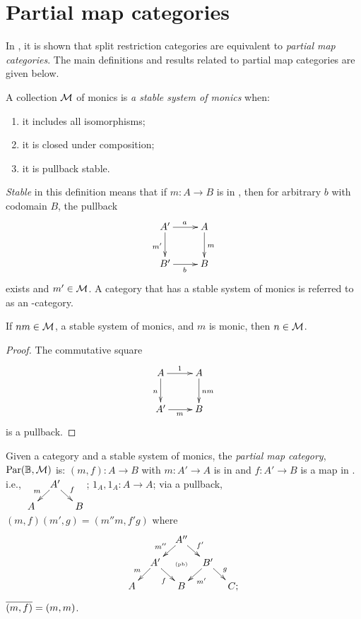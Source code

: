 


\section{Partial map categories} %
\label{sub:partial_map_categories}

In \cite{cockett2002:restcategories1}, it is shown that split restriction categories are
equivalent to \emph{partial map categories}. The main definitions and results related to
partial map categories are given below.

\begin{definition}
  A collection $\mathcal{M}$ of monics is \emph{a stable system of monics}
  when:
  \begin{enumerate}[{(}i{)}]
    \item it includes all isomorphisms;
    \item it is closed under composition;
    \item it is pullback stable.
  \end{enumerate}
\end{definition}

\emph{Stable} in this definition means that if $m:A\to B$ is in \Mstab, then for arbitrary
$b$ with codomain $B$, the pullback
\[
  \xymatrix{
    A'\ar[r]^a \ar[d]_{m'} &A\ar[d]^{m}\\
    B' \ar[r]_{b} & B
  }
\]
exists and $m' \in \mathcal{M}$. A category that has a stable system of monics
is referred to as an \Mstab-category.

\begin{lemma}
  If $n m \in \mathcal{M}$, a stable system of monics, and $m$ is monic, then $n \in \mathcal{M}$.
\end{lemma}
\begin{proof}
  The commutative square
  \[
    \xymatrix{
      A\ar[d]_n \ar[r]^{1} &A\ar[d]^{n m}\\
      A' \ar[r]_{m} & B
    }
  \]
  is a pullback.
\end{proof}

Given a category \B and a stable system of monics, the \emph{partial map category},
$\text{Par}(\mathbb{B},\mathcal{M})$ is:
    {$(m,f):A\to B$  with $m:A' \to A$ is in \Mstab and $f:A' \to B$ is a map in \B. i.e.,
      $\xymatrix @R-15pt @C-15pt{&A'\ar[dl]_{m} \ar[dr]^{f}\\A&&B}$;}
    {$1_A,1_A:A \to A$;}
    {via a pullback, $(m,f)(m',g) = (m'' m, f' g)$ where
      \[
        \xymatrix @C-15pt @R-15pt{
          &&A''\ar[dl]_{m''}\ar[dr]^{f'}\\
          &A'\ar[dl]_{m}\ar[dr]_{f}&\text{{\tiny (pb)}}&B'\ar[dl]^{m'}\ar[dr]^{g}\\
          A&&B&&C;
        }
      \]
    }
    {$\overline{(m,f)} = (m,m)$.}

